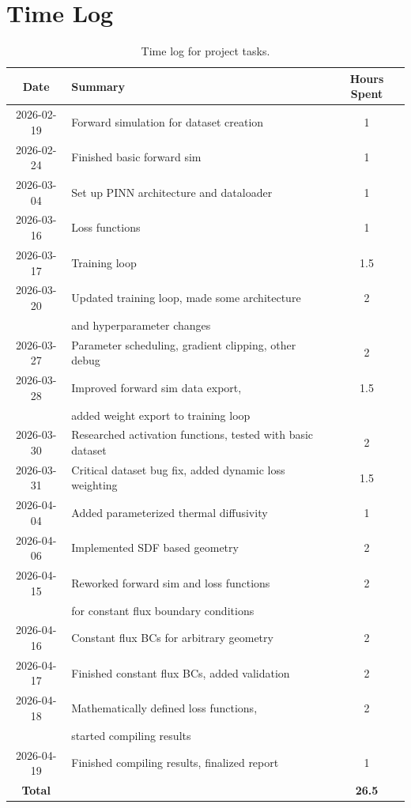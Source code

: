 \documentclass[10pt]{article}
\begin{document}
\section{Time Log}
\begin{table}[ht]
\centering
\begin{tabular}{|c|l|c|}
\hline
\textbf{Date} & \textbf{Summary} & \textbf{Hours Spent} \\
\hline
2026-02-19 & Forward simulation for dataset creation & 1 \\
2026-02-24 & Finished basic forward sim & 1 \\
2026-03-04 & Set up PINN architecture and dataloader & 1 \\
2026-03-16 & Loss functions & 1 \\
2026-03-17 & Training loop & 1.5 \\
2026-03-20 & Updated training loop, made some architecture & 2 \\
& and hyperparameter changes & \\
2026-03-27 & Parameter scheduling, gradient clipping, other debug & 2 \\
2026-03-28 & Improved forward sim data export, & 1.5 \\
& added weight export to training loop & \\
2026-03-30 & Researched activation functions, tested with basic dataset & 2 \\
2026-03-31 & Critical dataset bug fix, added dynamic loss weighting & 1.5 \\
2026-04-04 & Added parameterized thermal diffusivity & 1 \\
2026-04-06 & Implemented SDF based geometry & 2 \\
2026-04-15 & Reworked forward sim and loss functions & 2 \\
& for constant flux boundary conditions & \\
2026-04-16 & Constant flux BCs for arbitrary geometry & 2 \\
2026-04-17 & Finished constant flux BCs, added validation & 2 \\
2026-04-18 & Mathematically defined loss functions, & 2 \\
&  started compiling results & \\
2026-04-19 & Finished compiling results, finalized report & 1 \\

\hline
\textbf{Total} & & \textbf{26.5} \\
\hline
\end{tabular}
\caption{Time log for project tasks.}
\end{table}
\end{document}
